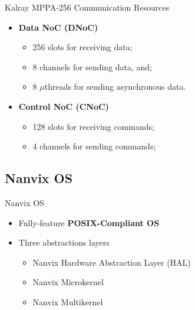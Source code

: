		\begin{frame}[fragile]{Kalray MPPA-256 Communication Resources}
			\begin{itemize}
				\item \textbf{Data NoC (DNoC)}
				\begin{itemize}
					\item 256 slots for receiving data;
					\item 8 channels for sending data, and;
					\item 8 $\mu$threads for sending asynchronous data.
				\end{itemize}

				\item \textbf{Control NoC (CNoC)}
				\begin{itemize}
					\item 128 slots for receiving commands;
					\item 4 channels for sending commands;
				\end{itemize}
			\end{itemize}

		\end{frame}

	\subsection{Nanvix OS}

		\begin{frame}[fragile]{Nanvix OS}
			\begin{itemize}
				\item Fully-feature \textbf{POSIX-Compliant OS}
				\item Three abstractions layers
				\begin{itemize}
					\item Nanvix Hardware Abstraction Layer (HAL)
					\item Nanvix Microkernel
					\item Nanvix Multikernel
				\end{itemize}
			\end{itemize}

		\end{frame}

